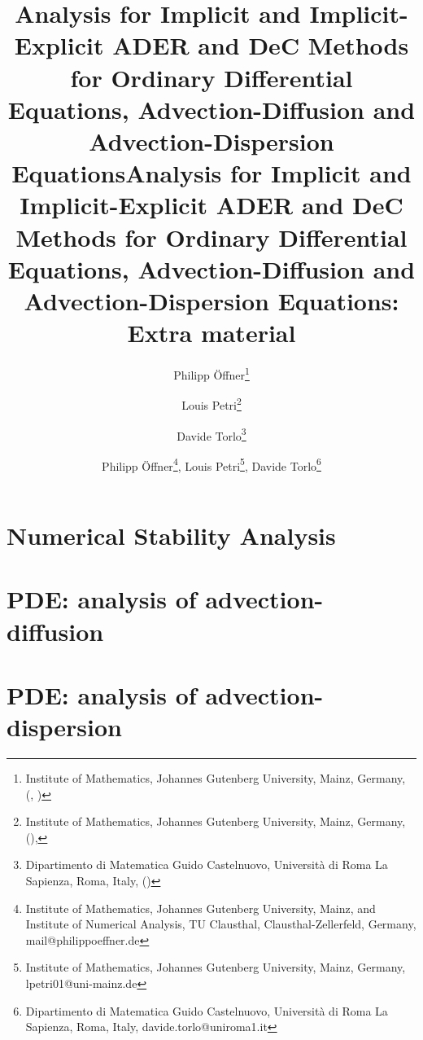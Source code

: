 \documentclass[USenglish]{article}
\title{Analysis for Implicit and Implicit-Explicit ADER and DeC Methods for Ordinary Differential Equations, Advection-Diffusion and Advection-Dispersion Equations}
\author{
	Philipp \"Offner\thanks{Institute of Mathematics, Johannes Gutenberg University, Mainz, Germany, (\email{poeffner@uni-mainz.de}, \orcid{0000-0002-1367-1917})
	} 
	\and 
	Louis Petri\thanks{Institute of Mathematics, Johannes Gutenberg University, Mainz, Germany, (\email{lpetri01@uni-mainz.de}), } 
	\and 
	Davide Torlo\thanks{Dipartimento di Matematica Guido Castelnuovo, Università di Roma La Sapienza,  Roma, Italy, (\email{davide.torlo@uniroma1.it})} 
}
\newcommand{\1}{\begin{pmatrix}
		1\\
		1
\end{pmatrix}}
\begin{document}
	\title{Analysis for Implicit and Implicit-Explicit ADER and DeC Methods for Ordinary Differential Equations, Advection-Diffusion and Advection-Dispersion Equations:\\ Extra material}
	
	\author{Philipp \"Offner\thanks{Institute of Mathematics, Johannes Gutenberg University, Mainz, and Institute of Numerical Analysis, TU Clausthal, Clausthal-Zellerfeld, Germany, mail@philippoeffner.de},
	Louis Petri\thanks{Institute of Mathematics, Johannes Gutenberg University, Mainz, Germany, lpetri01@uni-mainz.de },  
	Davide Torlo\thanks{Dipartimento di Matematica Guido Castelnuovo, Università di Roma La Sapienza,  Roma, Italy, davide.torlo@uniroma1.it}
	}
	\date{}
	\maketitle
	
%			
	
	
	
	\section{Numerical Stability Analysis}
	\label{sec: stability_analysis_ODE}
	

	\section{PDE: analysis of advection-diffusion}
	\label{sec: advection_diffusion}
	 
	
	\section{PDE: analysis of advection-dispersion}
	\label{sec:PDE_adv_disp}
	 
	
%
%	 
	

	
\end{document}
